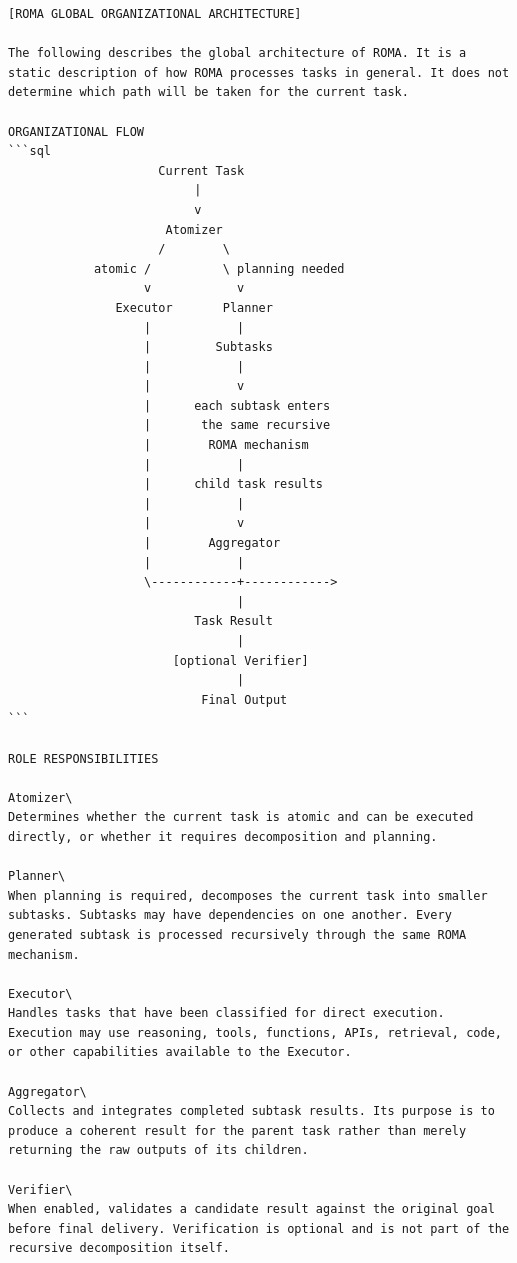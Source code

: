 \documentclass[10pt,letterpaper,twocolumn]{article}
\begin{document}
\begin{Verbatim}[fontsize=\small,breaklines=true,breakanywhere=true]
[ROMA GLOBAL ORGANIZATIONAL ARCHITECTURE]

The following describes the global architecture of ROMA. It is a static description of how ROMA processes tasks in general. It does not determine which path will be taken for the current task.

ORGANIZATIONAL FLOW
```sql
                     Current Task
                          |
                          v
                      Atomizer
                     /        \
            atomic /          \ planning needed
                   v            v
               Executor       Planner
                   |            |
                   |         Subtasks
                   |            |
                   |            v
                   |      each subtask enters
                   |       the same recursive
                   |        ROMA mechanism
                   |            |
                   |      child task results
                   |            |
                   |            v
                   |        Aggregator
                   |            |
                   \------------+------------>
                                |
                          Task Result
                                |
                       [optional Verifier]
                                |
                           Final Output
```

ROLE RESPONSIBILITIES

Atomizer\
Determines whether the current task is atomic and can be executed directly, or whether it requires decomposition and planning.

Planner\
When planning is required, decomposes the current task into smaller subtasks. Subtasks may have dependencies on one another. Every generated subtask is processed recursively through the same ROMA mechanism.

Executor\
Handles tasks that have been classified for direct execution. Execution may use reasoning, tools, functions, APIs, retrieval, code, or other capabilities available to the Executor.

Aggregator\
Collects and integrates completed subtask results. Its purpose is to produce a coherent result for the parent task rather than merely returning the raw outputs of its children.

Verifier\
When enabled, validates a candidate result against the original goal before final delivery. Verification is optional and is not part of the recursive decomposition itself.


\end{Verbatim}
\end{document}
